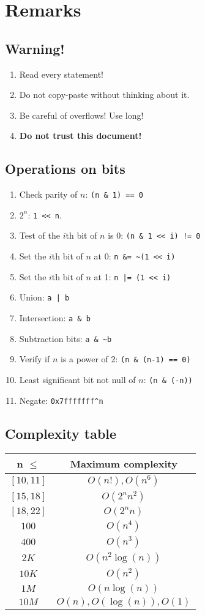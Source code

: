 \section{Remarks}
\subsection{Warning!}
\begin{enumerate}
	\item Read every statement!
	\item Do not copy-paste without thinking about it.
	\item Be careful of overflows! Use long!
	\item \textbf{Do not trust this document!}
\end{enumerate}
 
\subsection{Operations on bits}
\begin{enumerate}
	\item Check parity of $n$: \lstinline{(n & 1) == 0}
	\item $2^n$: \lstinline|1 << n|.
	\item Test of the $i$th bit of $n$ is $0$: \lstinline{(n & 1 << i) != 0}
	\item Set the $i$th bit of $n$ at 0: \lstinline{n &= ~(1 << i)}
	\item Set the $i$th bit of $n$ at 1: \lstinline{n |= (1 << i)}
	\item Union: \lstinline{a | b}
	\item Intersection: \lstinline{a & b}
	\item Subtraction bits: \lstinline{a & ~b}
	\item Verify if $n$ is a power of 2: \lstinline{(n & (n-1) == 0)}
	\item Least significant bit not null of $n$: \lstinline{(n & (-n))}
	\item Negate: \lstinline{0x7fffffff^n}
\end{enumerate}

\subsection{Complexity table}
\begin{center}
\begin{tabular}{|c|c|}
\hline
n $\leq$ & Maximum complexity\\
\hline
$[10,11]$ & $O(n!),O(n^6)$ \\
$[15,18]$ & $O(2^n n^2)$\\
$[18,22]$ & $O(2^n n)$\\
$100$ & $O(n^4)$\\
$400$ & $O(n^3)$\\
$2K$ & $O(n^2\log(n))$\\
$10K$ & $O(n^2)$\\
$1M$ & $O(n\log(n))$\\
$10M$ & $O(n),O(\log(n)),O(1)$\\
\hline
\end{tabular}
\end{center}
